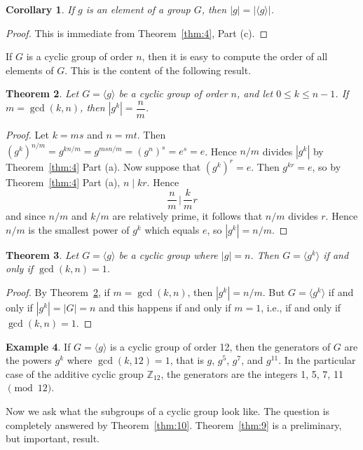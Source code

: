 \documentclass[11pt]{article}
\newcommand{\Z} {{\mathbb Z}}
\newcommand{\order}[1]{\ensuremath{|#1|}}
\newcommand{\divides}{\ensuremath{\mid}}
\newcommand{\<}{\ensuremath{\langle}}
\renewcommand{\>}{\ensuremath{\rangle}}
\newcommand{\eye}{\ensuremath{e}}
\theoremstyle{plain}
\newtheorem{thm}{Theorem}%
\newtheorem{cor}[thm]{Corollary}
\theoremstyle{definition}
\newtheorem{ex}[thm]{Example}
\begin{document}
\begin{cor}    If $g$ is an element of a group $G$, then
$\order{g}=|\langle g\rangle|$.
\end{cor}
\begin{proof}  This is immediate from Theorem~\ref{thm:4}, Part (c).
\end{proof}

If $G$ is a cyclic group  of order $n$,  then it is easy to
compute the order of all elements of $G$.  This is the content of
the following result.

\begin{thm}
\label{thm:6}
  Let $G=\langle g\rangle $ be a cyclic
group of order $n$, and let $0\le k\le n-1$.  If $m=\gcd (k, n)$,
then $\order{g^k}=\dfrac{n}{m}$.
\end{thm}

\begin{proof}  Let $k=ms$ and $n=mt$.  Then
$(g^k)^{n/m}=g^{kn/m}=g^{msn/m}=(g^n)^s=\eye^s=\eye$.  Hence $n/m$
divides $\order{g^k}$ by Theorem~\ref{thm:4} Part (a).  Now suppose that
$(g^k)^r=\eye$.  Then $g^{kr} = \eye$, so by Theorem~\ref{thm:4} Part (a), $n\divides
kr$. Hence $$\frac{n}{ m}\,\Big|\,\frac{k}{ m} r$$ and since $n/m$
and $k/m$ are relatively prime, it follows that $n/m$ divides $r$.
Hence $n/m$ is the smallest power of $g^k$ which equals $\eye$, so
$\order{g^k}=n/m$.
\end{proof}

\begin{thm}  Let $G=\langle g\rangle$ be a cyclic group where
$\order{g}=n$. Then $G=\langle g^k\rangle $ if and only if $\gcd (k, n)
= 1$.
\end{thm}

\begin{proof}  By Theorem~\ref{thm:6},  if $m=\gcd (k, n)$, then $\order{g^k}=n/m$.  But
$G=\langle g^k\rangle $ if and only if $\order{g^k}=|G|=n$ and this
happens if and only if $m=1$, i.e., if and only if $\gcd(k, n)=1$.
\end{proof}

\begin{ex}
  If $G=\langle g\rangle$ is a cyclic group of order 12, then
the generators of $G$ are the powers $g^k$ where $\gcd (k, 12) =
1$, that is $g$, $g^5$, $g^7$, and $g^{11}$.  In the particular
case of the additive cyclic group $\Z_{12}$, the generators are
the integers 1, 5, 7, 11 $\pmod{12}$.
\end{ex}
Now we ask what the subgroups of a  cyclic group look like.  The
question is completely answered by Theorem~\ref{thm:10}.  
Theorem~\ref{thm:9} is a preliminary, but important, result.
\end{document}
